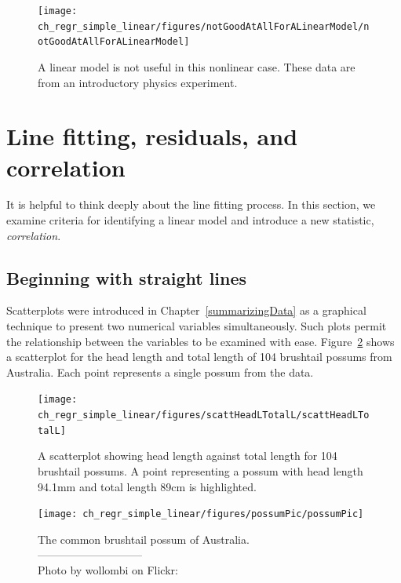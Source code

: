 \begin{figure}
   \centering
   \texttt{[image: ch\_regr\_simple\_linear/figures/notGoodAtAllForALinearModel/notGoodAtAllForALinearModel]}
   \caption{A linear model is not useful in this nonlinear case. These data are from an introductory physics experiment.}
   \label{notGoodAtAllForALinearModel}
\end{figure}


\section{Line fitting, residuals, and correlation}
\label{lineFittingResidualsCorrelation}

It is helpful to think deeply about the line fitting process. In this section, we examine criteria for identifying a linear model and introduce a new statistic, \emph{correlation}.

\subsection{Beginning with straight lines}


Scatterplots were introduced in Chapter~\ref{summarizingData} as a graphical technique to present two numerical variables simultaneously. Such plots permit the relationship between the variables to be examined with ease. Figure~\ref{scattHeadLTotalL} shows a scatterplot for the head length and total length of 104 brushtail possums from Australia. Each point represents a single possum from the data.

\begin{figure}
   \centering
   \texttt{[image: ch\_regr\_simple\_linear/figures/scattHeadLTotalL/scattHeadLTotalL]}
   \caption{A scatterplot showing head length against total length for 104 brushtail possums. A point representing a possum with head length 94.1mm and total length 89cm is highlighted.}
   \label{scattHeadLTotalL}
\end{figure}

\begin{figure}
   \centering
   \texttt{[image: ch\_regr\_simple\_linear/figures/possumPic/possumPic]}
   \caption{The common brushtail possum of Australia.\vspace{-1mm} \\
   -----------------------------\vspace{-2mm}\\
   {\footnotesize Photo by wollombi on Flickr: }\vspace{-8mm}}
   \label{possumPic}
\end{figure}

